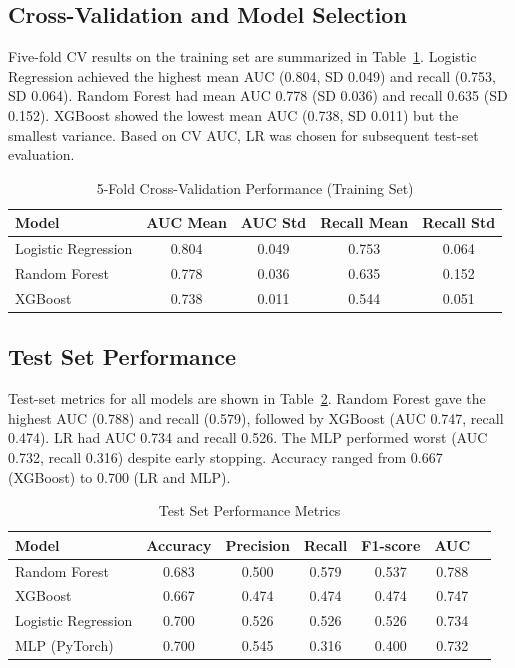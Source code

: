 \documentclass[12pt,a4paper]{article}
\begin{document}
\subsection{Cross-Validation and Model Selection}
Five-fold CV results on the training set are summarized in Table~\ref{tab:cv}. Logistic Regression achieved the highest mean AUC (0.804, SD 0.049) and recall (0.753, SD 0.064). Random Forest had mean AUC 0.778 (SD 0.036) and recall 0.635 (SD 0.152). XGBoost showed the lowest mean AUC (0.738, SD 0.011) but the smallest variance. Based on CV AUC, LR was chosen for subsequent test-set evaluation. %

\begin{table}[H]
\centering
\caption{5-Fold Cross-Validation Performance (Training Set)}
\begin{tabular}{lcccc}
\toprule
\textbf{Model} & \textbf{AUC Mean} & \textbf{AUC Std} & \textbf{Recall Mean} & \textbf{Recall Std} \\
\midrule
Logistic Regression & 0.804 & 0.049 & 0.753 & 0.064 \\
Random Forest & 0.778 & 0.036 & 0.635 & 0.152 \\
XGBoost & 0.738 & 0.011 & 0.544 & 0.051 \\
\bottomrule
\end{tabular}
\label{tab:cv}
\end{table}

\subsection{Test Set Performance}
Test-set metrics for all models are shown in Table~\ref{tab:test}. Random Forest gave the highest AUC (0.788) and recall (0.579), followed by XGBoost (AUC 0.747, recall 0.474). LR had AUC 0.734 and recall 0.526. The MLP performed worst (AUC 0.732, recall 0.316) despite early stopping. Accuracy ranged from 0.667 (XGBoost) to 0.700 (LR and MLP). %

\begin{table}[H]
\centering
\caption{Test Set Performance Metrics}
\begin{tabular}{lcccccc}
\toprule
\textbf{Model} & \textbf{Accuracy} & \textbf{Precision} & \textbf{Recall} & \textbf{F1-score} & \textbf{AUC} \\
\midrule
Random Forest & 0.683 & 0.500 & 0.579 & 0.537 & 0.788 \\
XGBoost & 0.667 & 0.474 & 0.474 & 0.474 & 0.747 \\
Logistic Regression & 0.700 & 0.526 & 0.526 & 0.526 & 0.734 \\
MLP (PyTorch) & 0.700 & 0.545 & 0.316 & 0.400 & 0.732 \\
\bottomrule
\end{tabular}
\label{tab:test}
\end{table}
\end{document}
